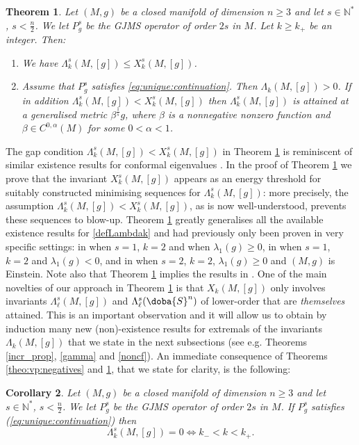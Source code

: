 \documentclass[10pt]{amsart}
\numberwithin{equation}{section}
\def\La{{\Lambda}}
\gdef\mS{\doba{S}}
\theoremstyle{plain}
\newtheorem{theo}{Theorem}[section]%
\newtheorem{corol}[theo]{Corollary}%
\theoremstyle{remark}
\begin{document}
\begin{theo} \label{theo:vp:positives}
Let $(M,g)$ be a closed manifold of dimension $n \ge 3$ and let $s \in \mathbb{N}^*$, $s < \frac{n}{2}$. We let $P_g^s$ be the GJMS operator of order $2s$ in $M$. Let $k \geq k_+$ be an integer. Then:
\begin{enumerate}
\item We have $\La_k^s(M,[g]) \leq  X_k^s(M,[g])$.
\item Assume that $P_g^s$ satisfies \eqref{eq:unique:continuation}. Then $\Lambda_k(M,[g])>0$. If in addition $\La_k^s(M,[g]) <  X_k^s(M,[g])$ then $\La_k^s(M,[g])$ is attained at a generalised metric $\beta^{\frac{1}{s}} g$, where $\beta$ is a nonnegative nonzero function and $\beta \in C^{0,\alpha}(M)$ for some $0< \alpha < 1$. 
\end{enumerate}
\end{theo}


The gap condition $\La_k^s(M,[g]) <  X_k^s(M,[g])$ in Theorem \ref{theo:vp:positives} is reminiscent of similar existence results for conformal eigenvalues \cite{Petrides2,Petrides3,Petrides4, Petrides6, NadirashviliSire1, KSminmax}. In the proof of Theorem \ref{theo:vp:positives} we prove that the invariant $X_k^s(M,[g])$ appears as an energy threshold for suitably constructed minimising sequences for $\Lambda_k^s(M,[g])$: more precisely, the assumption $\La_k^s(M,[g]) <  X_k^s(M,[g])$, as is now well-understood, prevents these sequences to blow-up. Theorem \ref{theo:vp:positives} greatly generalises all the available existence results for \eqref{defLambdak} and had previously only been proven in very specific settings: in \cite{AmmannHumbert} when $s=1$, $k=2$ and when $\lambda_1(g) \ge 0$, in \cite{ElSayed} when $s=1$, $k=2$ and $\lambda_1(g) < 0$, and in  \cite{BenBou} when $s=2$, $k=2$, $\lambda_1(g) \ge 0$ and $(M,g)$ is Einstein. Note also that Theorem \ref{theo:vp:positives} implies the results in \cite{SireXu}. One of the main novelties of our approach in Theorem \ref{theo:vp:positives} is that $X_k(M,[g])$ only involves invariants $\Lambda_{\ell}^s(M,[g])$ and $\Lambda_{\ell}^s(\mS^n)$ of lower-order that are \emph{themselves} attained. This is an important observation and it will allow us to obtain by induction many new (non)-existence results for extremals of the invariants $\Lambda_k(M,[g])$ that we state in the next subsections (see e.g. Theorems \ref{incr_prop}, \ref{gamma} and \ref{noncf}). An immediate consequence of Theorems \ref{theo:vp:negatives} and \ref{theo:vp:positives}, that we state for clarity, is the following:
\begin{corol} \label{Lambdak=0}
Let $(M,g)$ be a closed manifold of dimension $n \ge 3$ and let $s \in \mathbb{N}^*$, $s < \frac{n}{2}$. We let $P_g^s$ be the GJMS operator of order $2s$ in $M$. If $P_g^s$ satisfies (\ref{eq:unique:continuation}) then 
$$\Lambda_k^s(M,[g])=0 \Longleftrightarrow k_- < k <k_+.$$
\end{corol}
\end{document}
